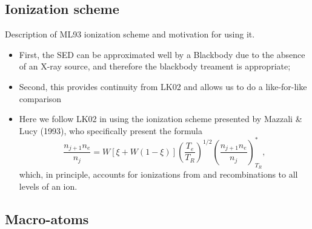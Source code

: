 \documentclass[preprint, a4paper, 11pt]{aastex}
\begin{document}
\subsection{Ionization scheme}
Description of ML93 ionization scheme and motivation for using it. 

\begin{itemize}
\item First, the SED can be approximated well by a Blackbody due to the 
absence of an X-ray source, and therefore the blackbody treament is appropriate; 
\item Second, this provides continuity from LK02 and allows us to do a like-for-like comparison

\item Here we follow LK02 in using the
ionization scheme presented by Mazzali \& Lucy (1993), who specifically
present the formula 
\begin{equation}
\frac{n_{j+1} n_e}{n_j} = W [\xi + W(1-\xi)]
\left(\frac{T_e}{T_R}\right)^{1/2}
\left(\frac{n_{j+1}n_e}{n_j}\right)^*_{T_R}, \label{ionization}
\end{equation}
which, in principle, accounts for ionizations from and
recombinations to all levels of an ion. 

\end{itemize}



\subsection{Macro-atoms}
\end{document}
